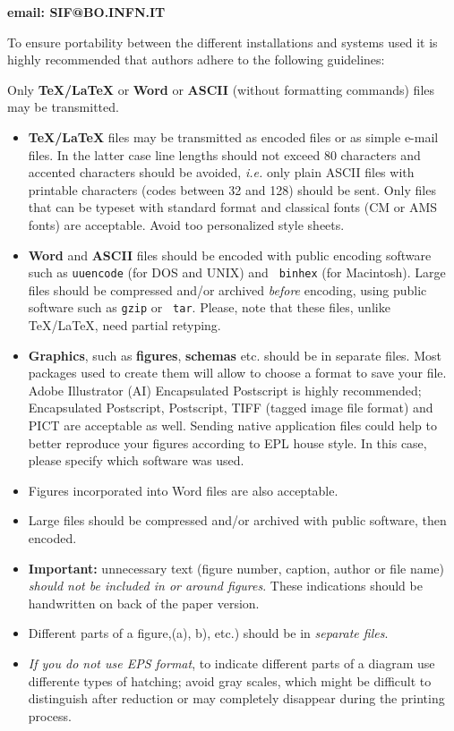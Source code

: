 \medskip
\centerline{\bf email: SIF@BO.INFN.IT}

\medskip
To ensure portability between the different installations and systems
used it is highly recommended that authors adhere to the following
guidelines:
\medskip

Only {\bf \TeX/\LaTeX} or {\bf Word} or {\bf ASCII} (without formatting
commands) files may be transmitted.
\medskip
\begin{itemize}
\item {\bf \TeX/\LaTeX} files may be transmitted as encoded files or as
simple e-mail files. In the latter case line  lengths should not exceed 80
characters and accented characters should be avoided, {\it i.e.\/} only
plain ASCII files with printable characters (codes between 32 and 128)
should be sent.
Only files that can be typeset with standard format and classical fonts
(CM or AMS fonts) are acceptable. Avoid too personalized style sheets.
\item {\bf Word} and {\bf ASCII} files should be encoded with public
encoding software such as {\tt uuencode} (for DOS and UNIX) and {\tt
binhex} (for Macintosh). Large files should be compressed and/or archived
{\it before\/} encoding, using public software such as {\tt gzip} or {\tt
tar}. Please, note that these files, unlike \TeX/\LaTeX, need partial
retyping.
\item {\bf Graphics}, such as {\bf figures}, {\bf schemas} etc. should be in
separate files. Most packages used to create them will allow to choose a
format to save your file. Adobe Illustrator (AI) Encapsulated Postscript
is highly recommended; Encapsulated Postscript, Postscript, TIFF (tagged
image file format) and PICT are acceptable as well.
Sending native application files could help to better reproduce your
figures according to EPL house style. In this case, please specify which
software was used.
\item Figures incorporated into Word files are also acceptable.
\item Large files should be compressed and/or archived with public
software, then encoded.
\item {\bf Important:} unnecessary text (figure number, caption, author or
file name) {\it should not be included in or around figures\/}. These
indications should be handwritten on back of the paper version. 
\item Different parts  of a figure,(a), b), etc.) should be in {\it
separate files\/}.
\item {\it If you do not use EPS format\/}, to indicate different parts of a
diagram use differente types of hatching; avoid gray scales, which might
be difficult to distinguish after reduction or may completely disappear
during the printing process.

\end{itemize}


